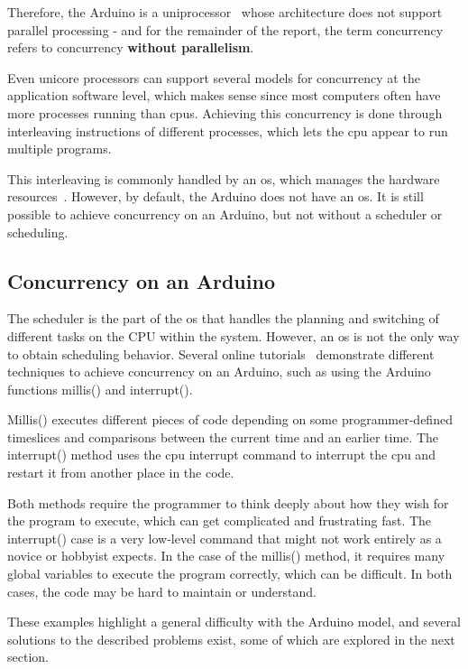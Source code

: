 Therefore, the Arduino is a uniprocessor~\cite{Bryant2016} whose architecture does not support parallel processing - and for the remainder of the report, the term concurrency refers to concurrency \textbf{without parallelism}.

Even unicore processors can support several models for concurrency at the application software level, which makes sense since most computers often have more processes running than \glspl{cpu}. Achieving this concurrency is done through interleaving instructions of different processes, which lets the \gls{cpu} appear to run multiple programs.

This interleaving is commonly handled by an \gls{os}, which manages the hardware resources~\cite{Bryant2016}. However, by default, the Arduino does not have an \gls{os}. It is still possible to achieve concurrency on an Arduino, but not without a scheduler or scheduling.

\subsection{Concurrency on an Arduino}\label{subsec:concurrencyinarduino}
The scheduler is the part of the \gls{os} that handles the planning and switching of different tasks on the CPU within the system. However, an \gls{os} is not the only way to obtain scheduling behavior. Several online tutorials~\cite{BadExample1, BadExample2} demonstrate different techniques to achieve concurrency on an Arduino, such as using the Arduino functions millis() and interrupt().

Millis() executes different pieces of code depending on some programmer-defined timeslices and comparisons between the current time and an earlier time. The interrupt() method uses the \gls{cpu} interrupt command to interrupt the \gls{cpu} and restart it from another place in the code.

Both methods require the programmer to think deeply about how they wish for the program to execute, which can get complicated and frustrating fast. The interrupt() case is a very low-level command that might not work entirely as a novice or hobbyist expects. In the case of the millis() method, it requires many global variables to execute the program correctly, which can be difficult. In both cases, the code may be hard to maintain or understand.

These examples highlight a general difficulty with the Arduino model, and several solutions to the described problems exist, some of which are explored in the next section.
